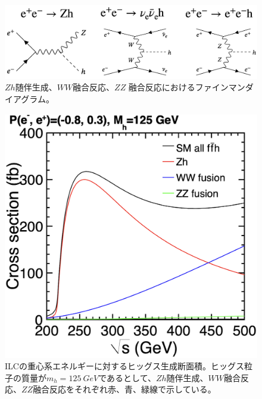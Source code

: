 \begin{figure}[h]
\begin{center}
 \includegraphics[keepaspectratio, scale=0.18]
 	{Figure/Introduction/higgs_cs_feynman.png}
	\caption{$Zh$随伴生成、$WW$融合反応、$ZZ$ 融合反応におけるファインマンダイアグラム\cite{tdr2}。}
\end{center}
\end{figure}

\begin{figure}[H]
	\begin{center}
 \includegraphics[keepaspectratio, scale=0.2]
 	{Figure/Introduction/hcs.png}
	 	\caption{ILCの重心系エネルギーに対するヒッグス生成断面積。ヒッグス粒子の質量が$m_h=\SI{125}{GeV}$であるとして、$Zh$随伴生成、$WW$融合反応、$ZZ$融合反応をそれぞれ赤、青、緑線で示している\cite{tdr2}。}
 	\label{hcs}
	\end{center}
 \end{figure}
 
